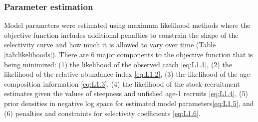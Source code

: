 \subsubsection*{Parameter estimation} %
\label{ssub:parameter_estimation}
Model parameters were estimated using maximum likelihood methods where the objective function includes additional penalties to constrain the shape of the selectivity curve and how much it is allowed to vary over time (Table \ref{tab:likelihoods}). There are 6 major components to the objective function that is being minimized: (1) the likelihood of the observed catch \eqref{eq:L1.1}, (2) the likelihood of the relative abundance index \eqref{eq:L1.2}, (3) the likelihood of the age-composition information \eqref{eq:L1.3}, (4) the likelihood of the stock-recruitment estimates given the values of steepness and unfished age-1 recruits \eqref{eq:L1.4}, (5) prior densities in negative log space for estimated model parameters\eqref{eq:L1.5}, and (6) penalties and constraints for selectivity coefficients \eqref{eq:L1.6}.  

